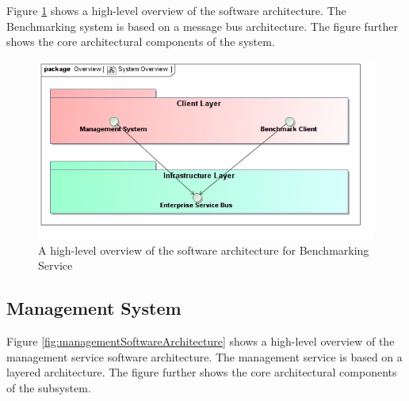 Figure \ref{fig:softwareArchitecture} shows a high-level overview of the 
software architecture. The Benchmarking system is based on a message bus 
architecture. The figure further shows the core architectural components of
the system.

\begin{figure}[H]
  \begin{center}
  \includegraphics[scale=0.4]{../Diagrams and Charts/Overview/SystemOverview.jpg}
  \caption{A high-level overview of the software architecture for Benchmarking Service}
  \label{fig:softwareArchitecture}
  \end{center}
\end{figure}

\subsection{Management System}
Figure \ref{fig:managementSoftwareArchitecture} shows a high-level overview of
the management service software architecture. The management service is based
on a layered architecture. The figure further shows the core architectural
components of the subsystem.

